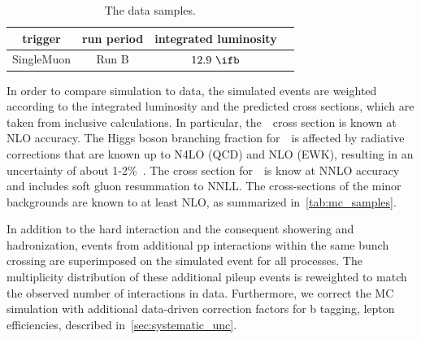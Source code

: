 \begin{table}[h!]
\begin{center}
\caption{The data samples.}
\label{tab:data_samples}
\begin{tabular}{cccc}
\hline
trigger & run period & integrated luminosity \\
\hline
SingleMuon & Run B &~$12.9~\ifb$~\\
\hline
\hline
\end{tabular}
\end{center}
\end{table}

In order to compare simulation to data, the simulated events are weighted according to the integrated luminosity and the predicted cross sections, which are taken from inclusive calculations. In particular, the~\ttH~cross section is known at NLO accuracy\cite{Dittmaier:1318996,Beenakker:2001rj,Beenakker:2002nc,Dawson:2002tg,Dawson:2003zu}. The Higgs boson branching fraction for~\Hbb~is affected by radiative corrections that are known up to N4LO (QCD) and NLO (EWK), resulting in an uncertainty of about 1-2\%~\cite{Djouadi:1997yw,Butterworth:2010ym,deFlorian:2016spz}.
The cross section for~\ttbar~is know at NNLO accuracy and includes soft gluon resummation to NNLL\cite{Czakon:2011xx}. The cross-sections of the minor backgrounds are known to at least NLO, as summarized in~\cref{tab:mc_samples}.

In addition to the hard interaction and the consequent showering and hadronization, events from additional pp interactions within the same bunch crossing are superimposed on the simulated event for all processes. The multiplicity distribution of these additional pileup events is reweighted to match the observed number of interactions in data. Furthermore, we correct the MC simulation with additional data-driven correction factors for b tagging, lepton efficiencies, described in~\cref{sec:systematic_unc}.

